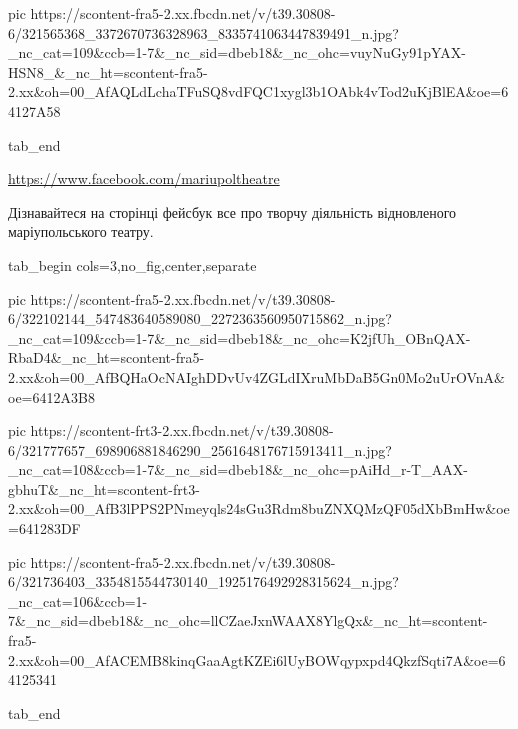      pic https://scontent-fra5-2.xx.fbcdn.net/v/t39.30808-6/321565368_3372670736328963_8335741063447839491_n.jpg?_nc_cat=109&ccb=1-7&_nc_sid=dbeb18&_nc_ohc=vuyNuGy91pYAX-HSN8_&_nc_ht=scontent-fra5-2.xx&oh=00_AfAQLdLchaTFuSQ8vdFQC1xygl3b1OAbk4vTod2uKjBlEA&oe=64127A58

  tab_end
\fi


\url{https://www.facebook.com/mariupoltheatre}

Дізнавайтеся на сторінці фейсбук все про творчу діяльність відновленого
маріупольського театру.

\begin{center}
\begin{minipage}{\textwidth}

\ifcmt
  tab_begin cols=3,no_fig,center,separate

     pic https://scontent-fra5-2.xx.fbcdn.net/v/t39.30808-6/322102144_547483640589080_2272363560950715862_n.jpg?_nc_cat=109&ccb=1-7&_nc_sid=dbeb18&_nc_ohc=K2jfUh_OBnQAX-RbaD4&_nc_ht=scontent-fra5-2.xx&oh=00_AfBQHaOcNAIghDDvUv4ZGLdIXruMbDaB5Gn0Mo2uUrOVnA&oe=6412A3B8

     pic https://scontent-frt3-2.xx.fbcdn.net/v/t39.30808-6/321777657_698906881846290_2561648176715913411_n.jpg?_nc_cat=108&ccb=1-7&_nc_sid=dbeb18&_nc_ohc=pAiHd_r-T_AAX-gbhuT&_nc_ht=scontent-frt3-2.xx&oh=00_AfB3lPPS2PNmeyqls24sGu3Rdm8buZNXQMzQF05dXbBmHw&oe=641283DF

     pic https://scontent-fra5-2.xx.fbcdn.net/v/t39.30808-6/321736403_3354815544730140_1925176492928315624_n.jpg?_nc_cat=106&ccb=1-7&_nc_sid=dbeb18&_nc_ohc=llCZaeJxnWAAX8YlgQx&_nc_ht=scontent-fra5-2.xx&oh=00_AfACEMB8kinqGaaAgtKZEi6lUyBOWqypxpd4QkzfSqti7A&oe=64125341

  tab_end
\fi

\end{minipage}
\end{center}
